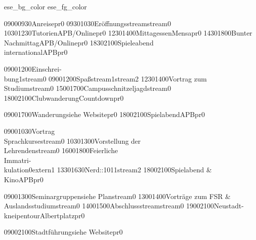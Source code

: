 \documentclass[a5paper,7pt]{scrreprt}
\begin{document}
\thispagestyle{empty}

\setslotsize{3.00cm}{0.25cm}
\settextframe{0.8mm}

\seteventcornerradius{0pt}



%
  {ese_bg_color}
  {ese_fg_color}

\begin{center}
\begin{timetable}
   {0900}{0930}{Anreise}{}{}{}{pr}{0}
   {0930}{1030}{Eröffnungsstream}{}{}{}{stream}{0}
   {1030}{1230}{Tutorien}{}{APB/Online}{}{pr}{0}
   {1230}{1400}{Mittagessen}{}{Mensa}{}{pr}{0}
   {1430}{1800}{Bunter Nachmittag}{}{APB/Online}{}{pr}{0}
   {1830}{2100}{Spieleabend\\international}{}{APB}{}{pr}{0}


   {0900}{1200}{Einschrei-\\bung}{}{}{1}{stream}{0}
   {0900}{1200}{Spaßstream}{}{}{1}{stream}{2}
   {1230}{1400}{Vortrag zum Studium}{}{}{}{stream}{0}
   {1500}{1700}{Campusschnitzeljagd}{}{}{}{stream}{0}
   {1800}{2100}{Clubwanderung}{}{Countdown}{}{pr}{0}

   {0900}{1700}{Wanderung}{}{siehe Website}{}{pr}{0}
   {1800}{2100}{Spielabend}{}{APB}{}{pr}{0}


   {0900}{1030}{Vortrag\\Sprachkurse}{}{}{}{stream}{0}
   {1030}{1300}{Vorstellung der\\Lehrenden}{}{}{}{stream}{0}
   {1600}{1800}{Feierliche\\Immatri-\\kulation}{}{}{0}{extern}{1}
   {1330}{1630}{Nerd::101}{}{}{1}{stream}{2}
   {1800}{2100}{Spielabend \&\\Kino}{}{APB}{}{pr}{0}

   {0900}{1300}{Seminargruppen}{}{siehe Plan}{}{stream}{0}
   {1300}{1400}{Vorträge zum FSR \&\\Auslandsstudium}{}{}{}{stream}{0}
   {1400}{1500}{Abschlussstream}{}{}{}{stream}{0}
   {1900}{2100}{Neustadt-\\kneipentour}{}{Albertplatz}{}{pr}{0}
  
   {0900}{2100}{Stadtführung}{}{siehe Website}{}{pr}{0}
\end{timetable}
\end{center}
\end{document}
